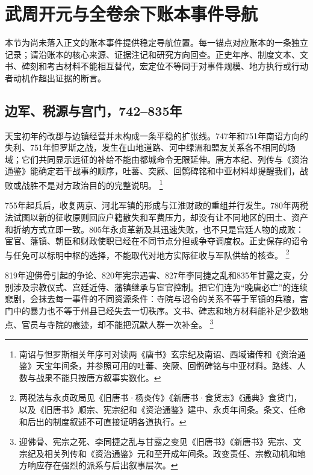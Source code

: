 \section{武周开元与全卷余下账本事件导航}
\label{sec:event-anchors-final-2}
本节为尚未落入正文的账本事件提供稳定导航位置。每一锚点对应账本的一条独立记录；请沿账本的核心来源、证据注记和研究方向回查。正史年序、制度文本、文书、碑刻和考古材料不能相互替代，宏定位不等同于对事件规模、地方执行或行动者动机作超出证据的断言。

\subsection{边军、税源与宫门，742--835年}

天宝初年的改郡与边镇经营并未构成一条平稳的扩张线。747年和751年南诏方向的失利、751年怛罗斯之战，发生在山地道路、河中绿洲和盟友关系各不相同的场域；它们共同显示远征的补给不能由都城命令无限延伸。唐方本纪、列传与《资治通鉴》能确定若干战事的顺序，吐蕃、突厥、回鹘碑铭和中亚材料却提醒我们，战败或战胜不是对方政治目的的完整说明。%
\footnote{南诏与怛罗斯相关年序可对读两《唐书》玄宗纪及南诏、西域诸传和《资治通鉴》天宝年间条，并参照可用的吐蕃、突厥、回鹘碑铭与中亚材料。路线、人数与战果不能只按唐方叙事实数化。}

755年起兵后，收复两京、河北军镇的形成与江淮财政的重组并行发生。780年两税法试图以新的征收原则回应户籍散失和军费压力，却没有让不同地区的田土、资产和折纳方式立即一致。805年永贞革新及其迅速失败，也不只是宫廷人物的成败：宦官、藩镇、朝臣和财政使职已经在不同节点分担或争夺调度权。正史保存的诏令与任免可以标明中枢的选择，不能取代对地方实际征收与军队供给的核查。%
\footnote{两税法与永贞政局见《旧唐书·杨炎传》《新唐书·食货志》《通典》食货门，以及《旧唐书》顺宗、宪宗纪和《资治通鉴》建中、永贞年间条。条文、任命和后出的制度叙述不可直接证明各道执行。}

819年迎佛骨引起的争论、820年宪宗遇害、827年李同捷之乱和835年甘露之变，分别涉及宗教仪式、宫廷近侍、藩镇继承与宦官控制。把它们连为“晚唐必亡”的连续悲剧，会抹去每一事件的不同资源条件：寺院与诏令的关系不等于军镇的兵粮，宫门中的暴力也不等于州县已经失去一切秩序。文书、碑志和地方材料能补足少数地点、官员与寺院的痕迹，却不能把沉默人群一次补全。%
\footnote{迎佛骨、宪宗之死、李同捷之乱与甘露之变见《旧唐书》《新唐书》宪宗、文宗纪及相关列传和《资治通鉴》元和至开成年间条。政变责任、宗教动机和地方响应存在强烈的派系与后出叙事层次。}

